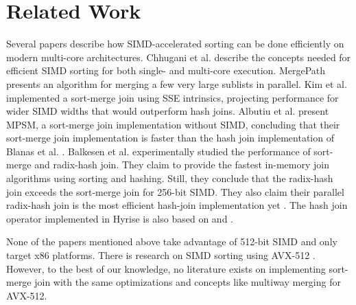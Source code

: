 \section{Related Work}
\label{sec:related-work}

Several papers describe how SIMD-accelerated sorting can be done efficiently on modern multi-core architectures.
Chhugani et al. \cite{10.14778/1454159.1454171} describe the concepts 
needed for efficient SIMD sorting for both single- and multi-core execution. MergePath \cite{MergePath}
presents an algorithm for merging a few very large sublists in parallel.
Kim et al. \cite{10.14778/1687553.1687564} implemented a sort-merge join using SSE intrinsics,
projecting performance for wider SIMD widths that would outperform hash joins. Albutiu 
et al. \cite{MPSM} present MPSM, a sort-merge join implementation 
without SIMD, concluding that their sort-merge join
implementation is faster than the hash join implementation of Blanas et al. \cite{10.1145/1989323.1989328}. 
Balkesen et al. \cite{Balkesen} experimentally studied the performance of sort-merge and radix-hash join.
They claim to provide the fastest in-memory join algorithms using sorting and hashing.
Still, they conclude that the radix-hash join exceeds the sort-merge join for 256-bit
SIMD. They also claim their parallel radix-hash join is the most efficient hash-join
implementation yet \cite{6544839}. The hash join operator
implemented in Hyrise is also based on \cite{6544839} and \cite{Balkesen}. 

None of the papers mentioned above take advantage of 512-bit SIMD and only target x86 platforms. 
There is research on SIMD sorting using AVX-512 \cite{Watkins, 8855628}.
However, to the best of our knowledge,
no literature exists on implementing sort-merge join with the same optimizations and concepts like
multiway merging for AVX-512. 

